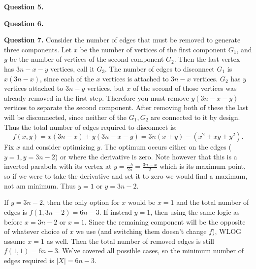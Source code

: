 \documentclass[letterpaper, reqno,11pt]{article}
\begin{document}
{\medskip\noindent\bf Question 5.} 

{\medskip\noindent\bf Question 6.} 


{\medskip\noindent\bf Question 7.} Consider the number of edges that must be removed to generate three components. Let $x$ be the number of vertices of the first component $G_1$, and $y$ be the number of vertices of the second component $G_2$. Then the last vertex has $3n-x-y$ vertices, call it $G_3$. The number of edges to disconnect $G_1$ is $x(3n-x)$, since each of the $x$ vertices is attached to $3n-x$ vertices. $G_2$ has $y$ vertices attached to $3n-y$ vertices, but $x$ of the second of those vertices was already removed in the first step. Therefore you must remove $y(3n-x-y)$ vertices to separate the second component. After removing both of these the last will be disconnected, since neither of the $G_1,G_2$ are connected to it by design. Thus the total number of edges required to disconnect is: 
\[
f(x,y)=x(3n-x)+y(3n-x-y)=3n(x+y)-(x^2+xy+y^2)
.\]
Fix $x$ and consider optimizing $y$. The optimum occurs either on the edges ($y=1,y=3n-2$) or where the derivative is zero. Note however that this is a inverted parabola with its vertex at $y=\frac{-b}{2a}=\frac{3n-x}{2}$ which is its maximum point, so if we were to take the derivative and set it to zero we would find a maximum, not am minimum. Thus $y=1$ or $y=3n-2$. 

If $y=3n-2$, then the only option for $x$ would be $x=1$ and the total number of edges is $f(1,3n-2)=6n-3$. If instead $y=1$, then using the same logic as before $x=3n-2$ or $x=1$. Since the remaining component will be the opposite of whatever choice of $x$ we use (and switching them doesn't change $f$), WLOG assume $x=1$ as well. Then the total number of removed edges is still $f(1,1)=6n-3$. We've covered all possible cases, so the minimum number of edges required is $|X|=6n-3$. 
\end{document}
